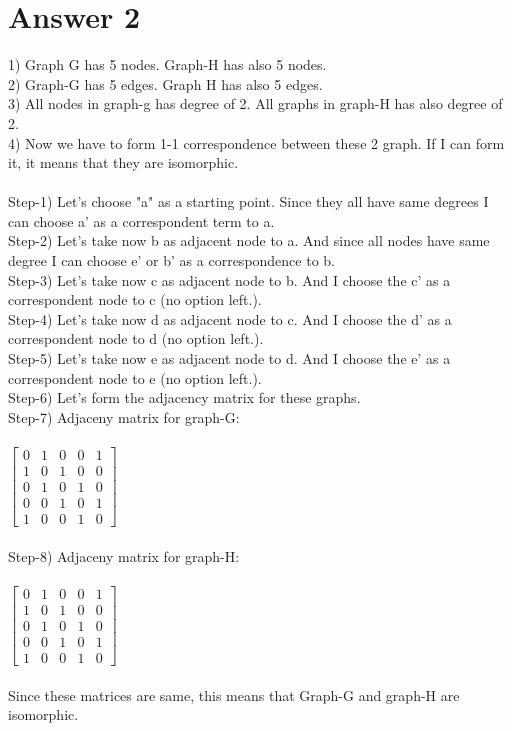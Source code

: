 \documentclass[12pt]{article}
\begin{document}
\section*{Answer 2}
1) Graph G has 5 nodes. Graph-H has also 5 nodes.\\
2) Graph-G has 5 edges. Graph H has also 5 edges.\\
3) All nodes in graph-g has degree of 2. All graphs in graph-H has also degree of 2.\\4) Now we have to form 1-1 correspondence between these 2 graph. If I can form it, it means that they are isomorphic.\\\\
Step-1) Let's choose "a" as a starting point. Since they all have same degrees I can choose a' as a correspondent term to a.\\
Step-2) Let's take now b as adjacent node to a. And since all nodes have same degree I can choose e' or b' as a correspondence to b.\\
Step-3) Let's take now c as adjacent node to b. And I choose the c' as a correspondent node to c (no option left.).\\
Step-4) Let's take now d as adjacent node to c. And I choose the d' as a correspondent node to d (no option left.).\\
Step-5) Let's take now e as adjacent node to d. And I choose the e' as a correspondent node to e (no option left.).\\
Step-6) Let's form the adjacency matrix for these graphs.\\
Step-7) Adjaceny matrix for graph-G:\\\\
$\begin{bmatrix}
0& 1 & 0& 0& 1\\
1& 0 & 1& 0 &0\\
0& 1 & 0& 1 &0\\
0& 0 & 1& 0 &1\\
1& 0 & 0& 1 &0
\end{bmatrix}$\\\\
Step-8) Adjaceny matrix for graph-H:\\\\
$\begin{bmatrix}
0& 1 & 0& 0& 1\\
1& 0 & 1& 0 &0\\
0& 1 & 0& 1 &0\\
0& 0 & 1& 0 &1\\
1& 0 & 0& 1 &0
\end{bmatrix}$\\\\
Since these matrices are same, this means that Graph-G and graph-H are isomorphic.
\end{document}
